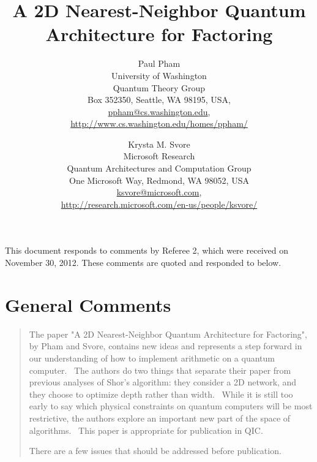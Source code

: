\documentclass{article}
\newcommand{\email}[1]{\href{mailto:#1}{#1}}
\theoremstyle{plain} \newtheorem{lemma}{Lemma}
\begin{document}

\title{A 2D Nearest-Neighbor Quantum Architecture for Factoring}


%
%
\author{Paul Pham\\
University of Washington\\
Quantum Theory Group\\
Box 352350, Seattle, WA 98195, USA,\\
\email{ppham@cs.washington.edu},\\
\url{http://www.cs.washington.edu/homes/ppham/}
\and
Krysta M. Svore\\
Microsoft Research\\
Quantum Architectures and Computation Group\\
One Microsoft Way, Redmond, WA 98052, USA\\
\email{ksvore@microsoft.com},\\
\url{http://research.microsoft.com/en-us/people/ksvore/}
}

\maketitle

This document responds to comments by Referee 2, which were received on
November 30, 2012. These comments are quoted and responded to below.

\section{General Comments}

\begin{quote}
The paper "A 2D Nearest-Neighbor Quantum Architecture for Factoring", 
by Pham and Svore, contains new ideas and represents a step forward 
in our understanding of how to implement arithmetic on a quantum 
computer.  The authors do two things that separate their paper from 
previous analyses of Shor's algorithm: they consider a 2D network, 
and they choose to optimize depth rather than width.  While it is 
still too early to say which physical constraints on quantum computers 
will be most restrictive, the authors explore an important new part 
of the space of algorithms.  This paper is appropriate for publication in QIC. 

There are a few issues that should be addressed before publication. 
\end{quote}
\end{document}
